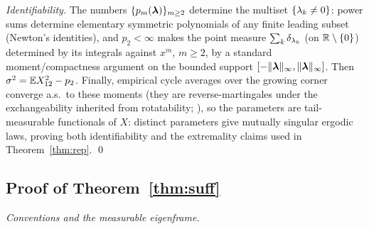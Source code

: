 \emph{Identifiability.} The numbers $\{p_m(\bm{\lambda})\}_{m\ge2}$ determine the
multiset $\{\lambda_k\ne0\}$: power sums determine elementary symmetric
polynomials of any finite leading subset (Newton's identities), and
$p_2<\infty$ makes the point measure $\sum_k\delta_{\lambda_k}$ (on
$\mathbb{R}\setminus\{0\}$) determined by its integrals against $x^m$, $m \ge 2$,
by a standard moment/compactness argument on the bounded support
$[-\lVert\bm{\lambda}\rVert_\infty,\lVert\bm{\lambda}\rVert_\infty]$. Then $\sigma^2=\mathbb{E}
X_{12}^2-p_2$. Finally, empirical cycle averages over the growing corner
converge a.s.\ to these moments (they are reverse-martingales under the
exchangeability inherited from rotatability; \citealp[Ch.~1]
{kallenberg2005probabilistic}), so the parameters are tail-measurable
functionals of $X$: distinct parameters give mutually singular ergodic
laws, proving both identifiability and the extremality claims used in
Theorem~\ref{thm:rep}. \qed

\subsection{Proof of Theorem~\ref{thm:suff}}

\emph{Conventions and the measurable eigenframe.}
